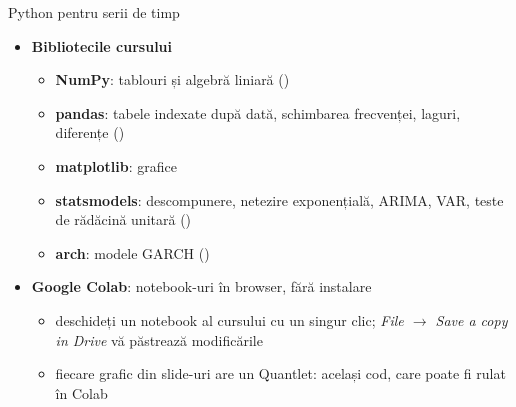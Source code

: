 \begin{frame}{Python pentru serii de timp}
\itemsize{\small}
\begin{itemize}
    \item \textbf{Bibliotecile cursului}
    \begin{itemize}
        \item \textbf{NumPy}: tablouri și algebră liniară ()
        \item \textbf{pandas}: tabele indexate după dată, schimbarea frecvenței, laguri, diferențe ()
        \item \textbf{matplotlib}: grafice
        \item \textbf{statsmodels}: descompunere, netezire exponențială, ARIMA, VAR, teste de rădăcină unitară ()
        \item \textbf{arch}: modele GARCH ()
    \end{itemize}
    \item \textbf{Google Colab}: notebook-uri în browser, fără instalare
    \begin{itemize}
        \item deschideți un notebook al cursului cu un singur clic; \emph{File $\to$ Save a copy in Drive} vă păstrează modificările
        \item fiecare grafic din slide-uri are un Quantlet: același cod, care poate fi rulat în Colab
    \end{itemize}
\end{itemize}
\end{frame}

